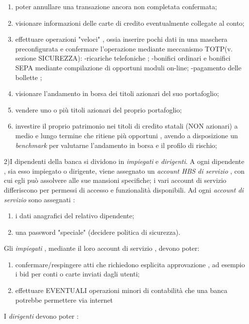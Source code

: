 {{{{\begin{enumerate}
	\item poter annullare una transazione ancora non completata confermata;
	\item visionare informazioni delle carte di credito eventualmente collegate al conto;
	\item effettuare operazioni "veloci" , ossia inserire pochi dati in una maschera preconfigurata e confermare l'operazione mediante meccanismo TOTP(v. sezione SICUREZZA):
			-ricariche telefoniche ;
			-bonifici ordinari e  bonifici SEPA mediante compilazione di opportuni moduli on-line;
			-pagamento delle bollette ;
	\item visionare l'andamento in borsa dei titoli azionari del suo portafoglio;
	\item vendere uno o più titoli azionari del proprio portafoglio;
	\item investire il proprio patrimonio nei titoli di credito statali (NON azionari) a medio e lungo termine che ritiene più opportuni , avendo a disposizione un \emph{benchmark} per valutarne l'andamento in borsa e il profilo di rischio;
	\end{enumerate}	
2)I dipendenti della banca si dividono in \emph{impiegati} e \emph{dirigenti}. A ogni dipendente , sia esso impiegato o dirigente, viene assegnato un \emph{account HBS di servizio} , con cui egli può assolvere alle sue mansioni specifiche; i vari account di servizio differiscono per permessi di accesso e funzionalità disponibili.
Ad ogni \emph{account di servizio} sono assegnati :
	\begin{enumerate}
	
	\item i dati anagrafici del relativo dipendente;
	\item una password "speciale" (decidere politica di sicurezza).
	\end{enumerate}	
Gli \emph{impiegati} , mediante il loro account di servizio , devono poter: 
	\begin{enumerate}
	
	\item confermare/respingere atti che richiedono esplicita approvazione , ad esempio i bid per conti o carte inviati dagli utenti; 
	\item effettuare EVENTUALI operazioni minori di contabilità che una banca potrebbe permettere via internet
 	\end{enumerate}

I \emph{dirigenti} devono poter :
	\begin{enumerate}
	

\end{enumerate}}}}}
